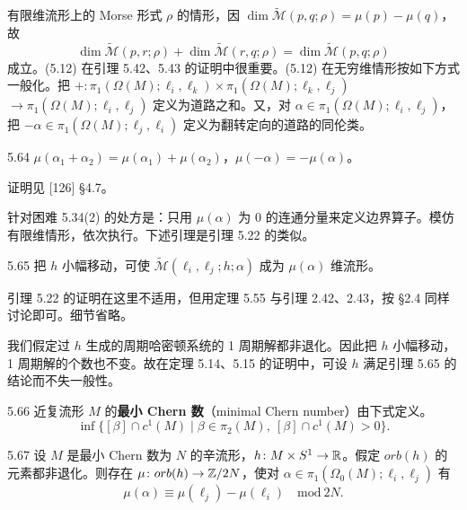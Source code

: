 有限维流形上的 Morse 形式 $\rho$ 的情形，因 $\dim\tilde{\mathcal{M}}(p,q;\rho)=\mu(p)-\mu(q)$，故
\begin{equation}
  \dim\tilde{\mathcal{M}}(p,r;\rho)+\dim\tilde{\mathcal{M}}(r,q;\rho)
  =\dim\tilde{\mathcal{M}}(p,q;\rho) \tag{5.12}
\end{equation}
成立。(5.12) 在引理 5.42、5.43 的证明中很重要。(5.12) 在无穷维情形按如下方式一般化。把 $+\colon\pi_1(\Omega(M);\ell_i,\ell_k)\times\pi_1(\Omega(M);\ell_k,\ell_j)$
$\to\pi_1(\Omega(M);\ell_i,\ell_j)$ 定义为道路之和。又，对 $\alpha\in\pi_1(\Omega(M);\ell_i,\ell_j)$，把 $-\alpha\in\pi_1(\Omega(M);\ell_j,\ell_i)$ 定义为翻转定向的道路的同伦类。

\begin{lemma}{5.64}
  $\mu(\alpha_1+\alpha_2)=\mu(\alpha_1)+\mu(\alpha_2)$，$\mu(-\alpha)=-\mu(\alpha)$。
\end{lemma}

证明见 [126] §4.7。

针对困难 5.34(2) 的处方是：只用 $\mu(\alpha)$ 为 0 的连通分量来定义边界算子。模仿有限维情形，依次执行。下述引理是引理 5.22 的类似。


\begin{lemma}{5.65}
  把 $h$ 小幅移动，可使 $\tilde{\mathcal{M}}(\ell_i,\ell_j;h;\alpha)$ 成为 $\mu(\alpha)$ 维流形。
\end{lemma}

引理 5.22 的证明在这里不适用，但用定理 5.55 与引理 2.42、2.43，按 §2.4 同样讨论即可。细节省略。

我们假定过 $h$ 生成的周期哈密顿系统的 1 周期解都非退化。因此把 $h$ 小幅移动，1 周期解的个数也不变。故在定理 5.14、5.15 的证明中，可设 $h$ 满足引理 5.65 的结论而不失一般性。

\begin{definition}{5.66}
  近复流形 $M$ 的\textbf{最小 Chern 数}（minimal Chern number）由下式定义。
  \[
    \inf\{[\beta]\cap c^1(M)\mid\beta\in\pi_2(M),\ [\beta]\cap c^1(M)>0\}.
  \]
\end{definition}

\begin{proposition*}{5.67}
  设 $M$ 是最小 Chern 数为 $N$ 的辛流形，$h\colon M\times S^1\to\mathbb{R}$。假定 $orb(h)$ 的元素都非退化。则存在 $\mu\colon orb(h)\to\mathbb{Z}/2N$，使对 $\alpha\in\pi_1(\Omega_0(M);\ell_i,\ell_j)$ 有
  \[
    \mu(\alpha)\equiv\mu(\ell_j)-\mu(\ell_i)\quad \mathrm{mod}\ 2N.
  \]
\end{proposition*}

